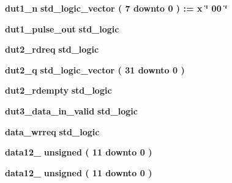 \begin{DoxyCompactItemize}
{\bf dut1\+\_\+n} {\bfseries \textcolor{comment}{std\+\_\+logic\+\_\+vector}\textcolor{vhdlchar}{ }\textcolor{vhdlchar}{(}\textcolor{vhdlchar}{ }\textcolor{vhdlchar}{ } \textcolor{vhdldigit}{7} \textcolor{vhdlchar}{ }\textcolor{keywordflow}{downto}\textcolor{vhdlchar}{ }\textcolor{vhdlchar}{ } \textcolor{vhdldigit}{0} \textcolor{vhdlchar}{ }\textcolor{vhdlchar}{)}\textcolor{vhdlchar}{ }\textcolor{vhdlchar}{ }\textcolor{vhdlchar}{ }\textcolor{vhdlchar}{\+:}\textcolor{vhdlchar}{=}\textcolor{vhdlchar}{ }\textcolor{vhdlchar}{ }\textcolor{vhdlchar}{x}\textcolor{vhdlchar}{ }\textcolor{keyword}{\char`\"{} 00 \char`\"{}}\textcolor{vhdlchar}{ }} 
\item 
{\bf dut1\+\_\+pulse\+\_\+out} {\bfseries \textcolor{comment}{std\+\_\+logic}\textcolor{vhdlchar}{ }} 
\item 
{\bf dut2\+\_\+rdreq} {\bfseries \textcolor{comment}{std\+\_\+logic}\textcolor{vhdlchar}{ }} 
\item 
{\bf dut2\+\_\+q} {\bfseries \textcolor{comment}{std\+\_\+logic\+\_\+vector}\textcolor{vhdlchar}{ }\textcolor{vhdlchar}{(}\textcolor{vhdlchar}{ }\textcolor{vhdlchar}{ } \textcolor{vhdldigit}{31} \textcolor{vhdlchar}{ }\textcolor{keywordflow}{downto}\textcolor{vhdlchar}{ }\textcolor{vhdlchar}{ } \textcolor{vhdldigit}{0} \textcolor{vhdlchar}{ }\textcolor{vhdlchar}{)}\textcolor{vhdlchar}{ }} 
\item 
{\bf dut2\+\_\+rdempty} {\bfseries \textcolor{comment}{std\+\_\+logic}\textcolor{vhdlchar}{ }} 
\item 
{\bf dut3\+\_\+data\+\_\+in\+\_\+valid} {\bfseries \textcolor{comment}{std\+\_\+logic}\textcolor{vhdlchar}{ }} 
\item 
{\bf data\+\_\+wrreq} {\bfseries \textcolor{comment}{std\+\_\+logic}\textcolor{vhdlchar}{ }} 
\item 
{\bf data12\+\_} {\bfseries \textcolor{comment}{unsigned}\textcolor{vhdlchar}{ }\textcolor{vhdlchar}{(}\textcolor{vhdlchar}{ }\textcolor{vhdlchar}{ } \textcolor{vhdldigit}{11} \textcolor{vhdlchar}{ }\textcolor{keywordflow}{downto}\textcolor{vhdlchar}{ }\textcolor{vhdlchar}{ } \textcolor{vhdldigit}{0} \textcolor{vhdlchar}{ }\textcolor{vhdlchar}{)}\textcolor{vhdlchar}{ }} 
\item 
{\bf data12\+\_} {\bfseries \textcolor{comment}{unsigned}\textcolor{vhdlchar}{ }\textcolor{vhdlchar}{(}\textcolor{vhdlchar}{ }\textcolor{vhdlchar}{ } \textcolor{vhdldigit}{11} \textcolor{vhdlchar}{ }\textcolor{keywordflow}{downto}\textcolor{vhdlchar}{ }\textcolor{vhdlchar}{ } \textcolor{vhdldigit}{0} \textcolor{vhdlchar}{ }\textcolor{vhdlchar}{)}\textcolor{vhdlchar}{ }} 

\end{DoxyCompactItemize}
